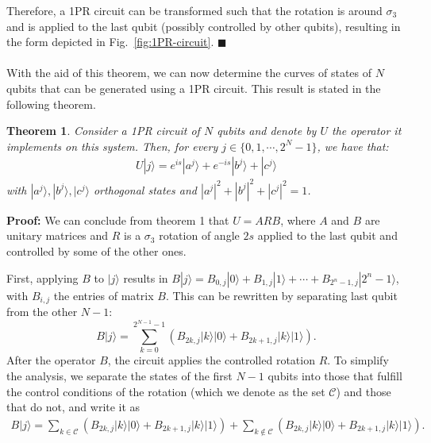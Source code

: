 \documentclass[10pt,letterpaper]{article} %
\newcommand{\fref}[1]{Fig.~\ref{#1}}
\newtheorem{theorem}{Theorem}
\begin{document}
Therefore, a 1PR circuit can be transformed such
that the rotation is around $\sigma_3$ and is applied to the last qubit 
(possibly controlled by other qubits), 
resulting in the form depicted in \fref{fig:1PR-circuit}. 
$\blacksquare$ \\
$\;$\\

With the aid of this theorem, we can now determine the curves
of states of $N$ qubits that can be generated using a 1PR circuit. 
This result is stated in the following theorem.

\begin{theorem}
Consider a 1PR circuit of $N$ qubits
and denote by $U$ the operator it implements on this system. 
Then, for every $j \in \{0, 1, \cdots, 2^N-1\}$, 
we have that:
\begin{align*}
U|j\rangle = e^{is} |a^j\rangle + e^{-is} |b^j\rangle + |c^j\rangle
\end{align*}
with $|a^j\rangle ,|b^j\rangle, |c^j\rangle$ orthogonal states and $|a^j|^2 + |b^j|^2 + |c^j|^2 = 1$.
\end{theorem}
\textbf{Proof:} 
We can conclude from theorem 1 that $U=ARB$,
where $A$ and $B$ are unitary matrices and $R$ is a $\sigma_3$ rotation of angle $2s$
applied to the last qubit and controlled by some of the other ones. 

First, applying $B$ to $|j\rangle$ results in $B|j\rangle = B_{0,j} |0\rangle + B_{1,j} |1 \rangle + \cdots + B_{2^n-1,j}|2^n-1\rangle$,
with $B_{i,j}$ the entries of matrix $B$.
This can be rewritten by separating last qubit from the other $N-1$:
\begin{equation}
B|j\rangle = \sum_{k=0}^{2^{N-1}-1} \left( B_{2k,j} |k\rangle|0\rangle  + B_{2k+1,j} |k \rangle |1\rangle  \right).
\end{equation}
After the operator $B$, the circuit applies the  controlled rotation $R$.
To simplify the analysis, we separate the states of
the first $N-1$ qubits into those that fulfill the control conditions of the rotation
(which we denote as the set $\mathcal{C}$)
and those that do not, and write it as
\begin{align}
B|j\rangle = 
   \sum_{k \in \mathcal{C}} \left( B_{2k,j} |k\rangle|0\rangle 
                                     + B_{2k+1,j} |k \rangle |1\rangle  \right) 
   + \sum_{k \not\in \mathcal{C}} \left( B_{2k,j} |k\rangle|0\rangle  
                                      + B_{2k+1,j} |k \rangle |1\rangle  \right).
\end{align}
\end{document}
